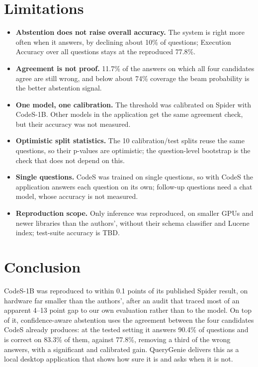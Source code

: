 \section{Limitations}

\begin{itemize}
	\item \textbf{Abstention does not raise overall accuracy.} The system is right more often when it answers, by declining about 10\% of questions; Execution Accuracy over all questions stays at the reproduced 77.8\%.
	\item \textbf{Agreement is not proof.} 11.7\% of the answers on which all four candidates agree are still wrong, and below about 74\% coverage the beam probability is the better abstention signal.
	\item \textbf{One model, one calibration.} The threshold was calibrated on Spider with CodeS-1B. Other models in the application get the same agreement check, but their accuracy was not measured.
	\item \textbf{Optimistic split statistics.} The 10 calibration/test splits reuse the same questions, so their p-values are optimistic; the question-level bootstrap is the check that does not depend on this.
	\item \textbf{Single questions.} CodeS was trained on single questions, so with CodeS the application answers each question on its own; follow-up questions need a chat model, whose accuracy is not measured.
	\item \textbf{Reproduction scope.} Only inference was reproduced, on smaller GPUs and newer libraries than the authors', without their schema classifier and Lucene index; test-suite accuracy is TBD.
\end{itemize}

\section{Conclusion}

CodeS-1B was reproduced to within 0.1 points of its published Spider result, on hardware far smaller than the authors', after an audit that traced most of an apparent 4--13 point gap to our own evaluation rather than to the model. On top of it, confidence-aware abstention uses the agreement between the four candidates CodeS already produces: at the tested setting it answers 90.4\% of questions and is correct on 83.3\% of them, against 77.8\%, removing a third of the wrong answers, with a significant and calibrated gain. QueryGenie delivers this as a local desktop application that shows how sure it is and asks when it is not.

